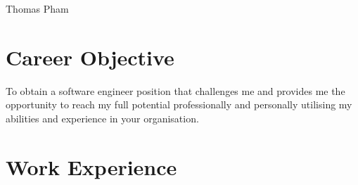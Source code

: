 \documentclass[12pt]{article} %
\begin{document}
\begin{paracol}{2} %


\parbox[top][0.12\textheight][c]{\linewidth}{ %
	\vspace{-0.04\textheight} %
	\centering %
	{\sffamily\Huge Thomas Pham}\\\medskip %
}


\section{Career Objective}


To obtain a software engineer position that challenges me and provides me the opportunity to reach my full
potential professionally and personally utilising my abilities and experience in your organisation.



\section{Work Experience}



\end{paracol}
\end{document}
